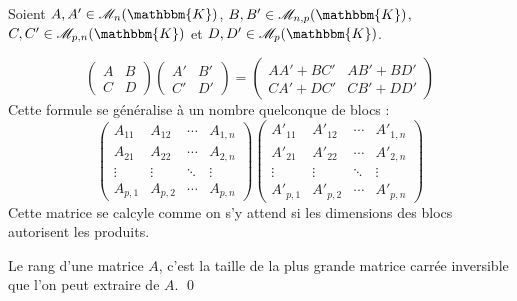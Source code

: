 \begin{prop}
	Soient $A,A' \in \mathcal{M}_n(\mathbbm{K})$, $B,B' \in \mathcal{M}_{n,p}(\mathbbm{K})$, $C,C' \in \mathcal{M}_{p,n}(\mathbbm{K})$ et $D, D' \in \mathcal{M}_p(\mathbbm{K})$.

	\[
		\left(\begin{array}{c|c}
			A&B\\ \hline
			C&D
		\end{array}\right)
		\left(\begin{array}{c|c}
			A'&B'\\ \hline
			C'&D'
		\end{array}\right) = 
		\left(\begin{array}{c|c}
			AA' + BC'& AB' + BD'\\ \hline
			CA' + DC'&CB' + DD'
		\end{array}\right)
	\] Cette formule se généralise à un nombre quelconque de blocs : \[
		\left(\begin{array}{c|c|c|c}
				A_{11}&A_{12}&\cdots&A_{1,n}\\ \hline
				A_{21}&A_{22}&\cdots&A_{2,n}\\ \hline
				\vdots&\vdots&\ddots&\vdots\\ \hline
				A_{p,1}&A_{p,2}&\cdots&A_{p,n}
		\end{array}\right)
		\left(\begin{array}{c|c|c|c}
				A'_{11}&A'_{12}&\cdots&A'_{1,n}\\ \hline
				A'_{21}&A'_{22}&\cdots&A'_{2,n}\\ \hline
				\vdots&\vdots&\ddots&\vdots\\ \hline
				A'_{p,1}&A'_{p,2}&\cdots&A'_{p,n}
		\end{array}\right)
	\] Cette matrice se calcyle comme on s'y attend si les dimensions des blocs autorisent les produits.
\end{prop}

\begin{prop}
	Le rang d'une matrice $A$, c'est la taille de la plus grande matrice carrée inversible que l'on peut extraire de $A$.
	\qed
\end{prop}




